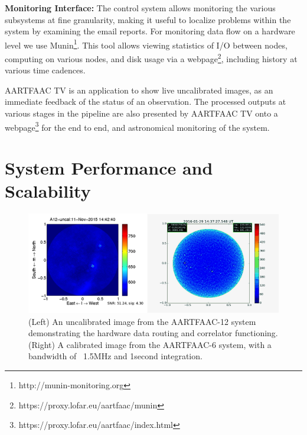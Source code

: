 \documentclass{ws-jai}
\begin{document}
\noindent \textbf  {Monitoring Interface:} The control  system allows monitoring
the  various  subsystems at  fine  granularity,  making  it useful  to  localize
problems within the system by examining  the email reports.  For monitoring data
flow         on         a          hardware         level         we         use
Munin\footnote{http://munin-monitoring.org}. This tool allows viewing statistics
of  I/O  between  nodes, computing  on  various  nodes,  and  disk usage  via  a
webpage\footnote{https://proxy.lofar.eu/aartfaac/munin},  including  history  at
various time cadences.

AARTFAAC TV is an application to  show live uncalibrated images, as an immediate
feedback of  the status  of an  observation.  The  processed outputs  at various
stages   in  the   pipeline  are   also  presented   by  AARTFAAC   TV  onto   a
webpage\footnote{https://proxy.lofar.eu/aartfaac/index.html} for the end to end,
and astronomical monitoring of the system.


\section {\label{sec:results} System Performance and Scalability}
\begin{figure}[htbp]
   \includegraphics[width=\textwidth]{Figs/A12uncal_A6cal/Slide1.png}
   \caption{(Left)   An  uncalibrated   image   from   the  AARTFAAC-12   system
     demonstrating the hardware data routing and correlator functioning. (Right)
     A calibrated image from the AARTFAAC-6  system, with a bandwidth of ~1.5MHz
     and 1second integration.}
   \label{fig:afaac_snapshots}
 \end{figure}
\end{document}
